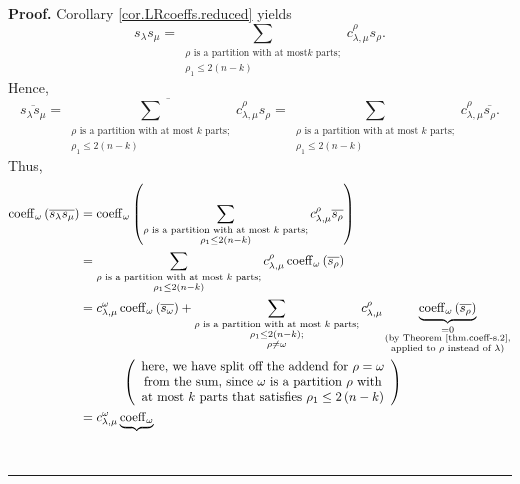 \documentclass[numbers=enddot,12pt,final,onecolumn,notitlepage]{scrartcl}%
\theoremstyle{definition}
\newenvironment{proof}[1][Proof]{\noindent\textbf{#1.} }{\ \rule{0.5em}{0.5em}}
\let\sumnonlimits\sum
\renewcommand{\sum}{\sumnonlimits\limits}
\begin{document}
\begin{proof}
Corollary \ref{cor.LRcoeffs.reduced} yields%
\[
s_{\lambda}s_{\mu}=\sum_{\substack{\rho\text{ is a partition with at most
}k\text{ parts;}\\\rho_{1}\leq2\left(  n-k\right)  }}c_{\lambda,\mu}^{\rho
}s_{\rho}.
\]
Hence,%
\[
\overline{s_{\lambda}s_{\mu}}=\overline{\sum_{\substack{\rho\text{ is a
partition with at most }k\text{ parts;}\\\rho_{1}\leq2\left(  n-k\right)
}}c_{\lambda,\mu}^{\rho}s_{\rho}}=\sum_{\substack{\rho\text{ is a partition
with at most }k\text{ parts;}\\\rho_{1}\leq2\left(  n-k\right)  }%
}c_{\lambda,\mu}^{\rho}\overline{s_{\rho}}.
\]
Thus,%
\begin{align*}
\operatorname*{coeff}\nolimits_{\omega}\left(  \overline{s_{\lambda}s_{\mu}%
}\right)   &  =\operatorname*{coeff}\nolimits_{\omega}\left(  \sum
_{\substack{\rho\text{ is a partition with at most }k\text{ parts;}\\\rho
_{1}\leq2\left(  n-k\right)  }}c_{\lambda,\mu}^{\rho}\overline{s_{\rho}%
}\right) \\
&  =\sum_{\substack{\rho\text{ is a partition with at most }k\text{
parts;}\\\rho_{1}\leq2\left(  n-k\right)  }}c_{\lambda,\mu}^{\rho
}\operatorname*{coeff}\nolimits_{\omega}\left(  \overline{s_{\rho}}\right) \\
&  =c_{\lambda,\mu}^{\omega}\operatorname*{coeff}\nolimits_{\omega}\left(
\overline{s_{\omega}}\right)  +\sum_{\substack{\rho\text{ is a partition with
at most }k\text{ parts;}\\\rho_{1}\leq2\left(  n-k\right)  ;\\\rho\neq\omega
}}c_{\lambda,\mu}^{\rho}\underbrace{\operatorname*{coeff}\nolimits_{\omega
}\left(  \overline{s_{\rho}}\right)  }_{\substack{=0\\\text{(by Theorem
\ref{thm.coeff-s.2},}\\\text{applied to }\rho\text{ instead of }%
\lambda\text{)}}}\\
&  \ \ \ \ \ \ \ \ \ \ \left(
\begin{array}
[c]{c}%
\text{here, we have split off the addend for }\rho=\omega\\
\text{from the sum, since }\omega\text{ is a partition }\rho\text{ with}\\
\text{at most }k\text{ parts that satisfies }\rho_{1}\leq2\left(  n-k\right)
\end{array}
\right) \\
&  =c_{\lambda,\mu}^{\omega}\underbrace{\operatorname*{coeff}\nolimits_{\omega
}}
\end{align*}
\end{proof}
\end{document}
